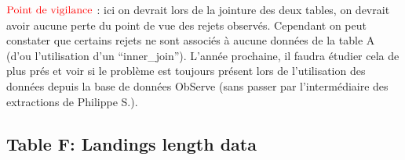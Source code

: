 \documentclass[]{article}
\begin{document}
\textbf{\(\color{red}{\text{Point de vigilance}}\)} : ici on devrait
lors de la jointure des deux tables, on devrait avoir aucune perte du
point de vue des rejets observés. Cependant on peut constater que
certains rejets ne sont associés à aucune données de la table A (d'ou
l'utilisation d'un ``inner\_join''). L'année prochaine, il faudra
étudier cela de plus prés et voir si le problème est toujours présent
lors de l'utilisation des données depuis la base de données ObServe
(sans passer par l'intermédiaire des extractions de Philippe S.).

\hypertarget{table-f-landings-length-data}{%
\subsection{Table F: Landings length
data}\label{table-f-landings-length-data}}
\end{document}
